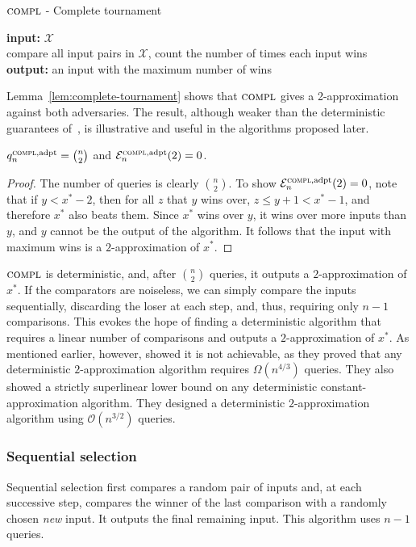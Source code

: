 \documentclass[twoside,11pt]{article}
\newcommand{\cO}{\mathcal{O}}
\newcommand{\cX}{\mathcal{X}}
\newcommand{\cE}{\mathcal{E}}
\newcommand{\algorithms}[1]{\textsc{#1}}
\newcommand{\algcomp}{\algorithms{compl}}
\newcommand{\maxx}{x^*}
\newcommand{\pe}{\cE}
\newcommand{\adaptive}{\textnormal{adpt}}
\begin{document}
\begin{algorithm}
\caption{$\algcomp$ - Complete tournament}
\textbf{input:} $\cX$\\
\qquad compare all input pairs in $\cX$, count the number of times each input wins\\
\textbf{output:} an input with the maximum number of wins 
\end{algorithm}

Lemma~\ref{lem:complete-tournament} shows that $\algcomp$ gives a 2-approximation
against both adversaries. The result, although weaker than the
deterministic guarantees of~\citet{AjtaiFHN15}, is illustrative and
useful in the algorithms proposed later. 
\begin{lemma}
 \label{lem:complete-tournament}
$q_n^{\algcomp,\adaptive}=\binom{n}{2}$ and $\pe_n^{\algcomp,\adaptive}(2)=0$. 
\end{lemma}
\begin{proof}
The number of queries is clearly ${n\choose 2}$.  To show
$\pe_n^{\algcomp,\adaptive}(2)=0$, note that if $y<\maxx-2$, then
for all $z$ that $y$ wins over, $z\le y+1 <\maxx-1$, and
  therefore $\maxx$ also beats them. Since $\maxx$ wins over $y$, it
  wins over more inputs than $y$, and  $y$ cannot be the output of
  the algorithm. It follows that the input with maximum
  wins is a $2$-approximation of $\maxx$.
\end{proof}


$\algcomp$ is deterministic, and, after $\binom n2$ queries, 
it outputs a $2$-approximation of $\maxx$.  If the
  comparators are noiseless, we can simply compare the inputs
  sequentially, discarding the loser at each step, and, thus, requiring only
  $n-1$ comparisons.  This evokes the hope of finding a deterministic
  algorithm that requires a linear number of comparisons and outputs a
  $2$-approximation of $\maxx$. As mentioned earlier, however, 
  \citet{AjtaiFHN15} showed it is not achievable, as they proved that any
  deterministic $2$-approximation algorithm requires $\Omega(n^{4/3})$
  queries. They also showed a strictly superlinear lower bound on any
  deterministic constant-approximation algorithm. They 
  designed a deterministic $2$-approximation algorithm using
  $\cO(n^{3/2})$ queries.

\subsubsection{Sequential selection}
\label{subsec:sequential}
Sequential selection first compares a random pair of inputs and, at each
successive step, compares the winner of the last comparison with
a randomly chosen \emph{new} input. It outputs the final remaining input. 
This algorithm uses $n-1$ queries.
\end{document}
